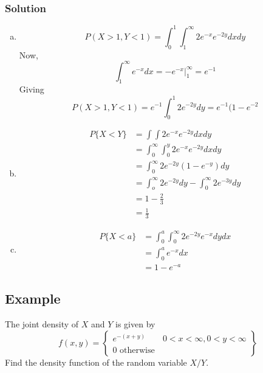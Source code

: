 \subsubsection*{Solution}
\begin{enumerate}[a. ]
    \item \[P(X > 1, Y < 1) = \int^1_0 \int^\infty_1 2e^{-x}e^{-2y} dx dy\] Now, \[\int^\infty_1 e^{-x} dx = -e^{-x} \big|^\infty_1 = e^{-1}\] Giving \[P(X > 1, Y < 1)  = e^{-1} \int^1_0 2e^{-2y} dy = e^{-1} (1 - e^{-2}\] 
    \item \begin{equation*}
        \begin{split}
            P\{X < Y\} &= \int\int  2e^{-x}e^{-2y} dx dy\\
            &= \int^\infty_0 \int^y_0  2e^{-x}e^{-2y} dx dy\\
            &= \int^\infty_0 2e^{-2y}(1-e^{-y}) dy\\
            &= \int^\infty_o 2e^{-2y} dy - \int^\infty_0 2e^{-3y} dy\\
            &= 1 - \frac{2}{3}\\
            &= \frac{1}{3}
        \end{split}
    \end{equation*}
    \item \begin{equation*}
        \begin{split}
            P\{X < a\} &= \int^a_0 \int^\infty_0 2e^{-2y} e^{-x} dy dx\\
            &= \int^a_0 e^{-x} dx\\
            &= 1 - e^{-a}
        \end{split}
    \end{equation*}
\end{enumerate}
\subsection*{Example}
The joint density of $X$ and $Y$ is given by 
\begin{equation*}
    f(x,y) =
    \left\{
        \begin{array}{lr}
            e^{-(x + y)} \qquad 0 < x < \infty, 0 < y < \infty\\
            0 \text{ otherwise}
        \end{array}
    \right\}
\end{equation*}
Find the density function of the random variable $X/Y$.
